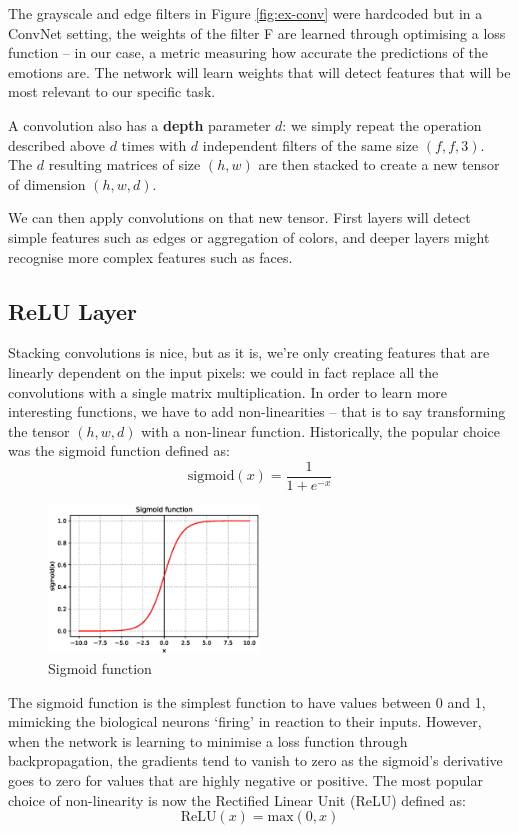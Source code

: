 The grayscale and edge filters in Figure \ref{fig:ex-conv} were hardcoded but in a ConvNet setting, the weights of the filter F are learned through optimising a loss function -- in our case, a metric measuring how accurate the predictions of the emotions are. The network will learn weights that will detect features that will be most relevant to our specific task.

A convolution also has a \textbf{depth} parameter $d$: we simply repeat the operation described above $d$ times with $d$ independent filters of the same size $(f, f, 3)$. The $d$ resulting matrices of size $(h,w)$ are then stacked to create a new tensor of dimension $(h,w,d)$.

We can then apply convolutions on that new tensor. First layers will detect simple features such as edges or aggregation of colors, and deeper layers might recognise more complex features such as faces.

\subsection{ReLU Layer}
Stacking convolutions is nice, but as it is, we're only creating features that are linearly dependent on the input pixels: we could in fact replace all the convolutions with a single matrix multiplication. In order to learn more interesting functions, we have to add non-linearities -- that is to say transforming the tensor $(h,w,d)$ with a non-linear function. Historically, the popular choice was the sigmoid function defined as:
\begin{equation}
\text{sigmoid}(x) = \frac{1}{1+e^{-x}}
\end{equation}

\begin{figure}[H]
\centering
\includegraphics[width=0.5\textwidth]{Images/sigmoid.eps}
\caption{Sigmoid function}
\end{figure}

The sigmoid function is the simplest function to have values between 0 and 1, mimicking the biological neurons `firing' in reaction to their inputs. However, when the network is learning to minimise a loss function through backpropagation, the gradients tend to vanish to zero as the sigmoid's derivative goes to zero for values that are highly negative or positive. The most popular choice of non-linearity is now the Rectified Linear Unit (ReLU) \cite{nair} defined as:
\begin{equation}
\text{ReLU}(x) = \text{max}(0,x)
\end{equation}

